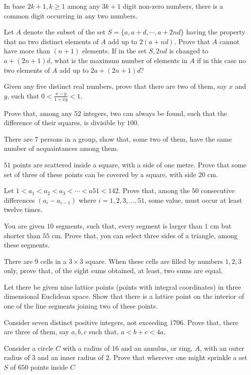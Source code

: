   In base $2k + 1, k \geq 1$ among any $3k + 1$ digit non-zero numbers, there is a common digit occurring
  in any two numbers.
\item Let $A$ denote the subset of the set $S = \{a, a + d, \cdots, a + 2nd\}$ having the property that no
  two distinct elements of $A$ add up to $2(a + nd)$. Prove that $A$ cannot have more than $(n + 1)$
  elements. If in the set $S, 2nd$ is changed to $a + (2n + 1)d$, what  is the maximum number of elements in
  $A$ if in this case no two elements of $A$ add up to $2a + (2n + 1)d$?
\item Given any five distinct real numbers, prove that there are two of them, say $x$ and $y$, such that $0<
  \frac{x - y}{1 + xy} < 1$.
\item Prove that, among any $52$ integers, two can always be found, such that the difference of their
  squares, is divisible by $100$.
\item There are $7$ persons in a group, show that, some two of them, have the same number of acquaintances
  among them.
\item $51$ points are scattered inside a square, with a side of one metre. Prove that some set of three of
  these points can be covered by a square, with side $20$ cm.
\item Let $1 < a_1 < a_2 < a_3 < \cdots < a51 < 142$. Prove that, among the $50$ consecutive differences
  $(a_i − a_{i - 1})$ where $i =1, 2, 3, \ldots, 51$, some value, must occur at least twelve times.
\item You are given $10$ segments, such that, every segment is larger than $1$ cm but shorter than $55$
  cm. Prove that, you can select three sides of a triangle, among these segments.
\item There are $9$ cells in a $3\times3$ square. When these cells are filled by numbers $1, 2, 3$ only,
  prove that, of the eight sums obtained, at least, two sums are equal.
\item Let there be given nine lattice points (points with integral coordinates) in three dimensional
  Euclidean space.  Show that there is a lattice point on the interior of one of the line segments joining
  two of these points.
\item Consider seven distinct positive integers, not exceeding $1706$. Prove that, there are three of them,
  say $a, b, c$ such that, $a < b + c < 4a$.
\item Consider a circle $C$ with a radius of $16$ and an annulus, or ring, $A$, with an outer radius of $3$
  and an inner radius of $2$. Prove that wherever one might sprinkle a set $S$ of $650$ points inside $C$
